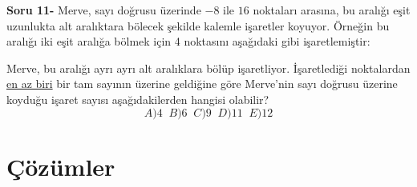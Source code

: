 \documentclass[a4paper,12pt,twocolumn]{article}
\begin{document}
\textbf{Soru 11-} Merve, sayı doğrusu üzerinde $-8$ ile $16$ noktaları arasına, bu aralığı eşit uzunlukta alt aralıktara bölecek şekilde kalemle işaretler koyuyor. Örneğin bu aralığı iki eşit aralığa bölmek için 4 noktasını aşağıdaki gibi işaretlemiştir:
\begin{center}
\end{center}
Merve, bu aralığı ayrı ayrı alt aralıklara bölüp işaretliyor. İşaretlediği noktalardan \underline{en az biri} bir tam sayının üzerine geldiğine göre Merve'nin sayı doğrusu üzerine koyduğu işaret sayısı aşağıdakilerden hangisi olabilir?
$$A)4\;\;B)6\;\;C)9\;\;D)11\;\;E)12$$

\section{Çözümler}
\end{document}
